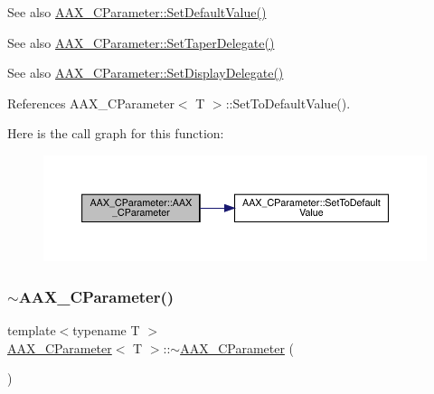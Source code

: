 \begin{DoxyItemize}
\item \begin{DoxySeeAlso}{See also}
\mbox{\hyperlink{a01537_af6f47fe823dd44a0434ca5041f08d0bd}{A\+A\+X\+\_\+\+C\+Parameter\+::\+Set\+Default\+Value()}}
\end{DoxySeeAlso}

\item \begin{DoxySeeAlso}{See also}
\mbox{\hyperlink{a01537_a73951bf97667382f01103a9230ce0c3e}{A\+A\+X\+\_\+\+C\+Parameter\+::\+Set\+Taper\+Delegate()}}
\end{DoxySeeAlso}

\item \begin{DoxySeeAlso}{See also}
\mbox{\hyperlink{a01537_a75619ec0a487c28966dc5448e4d2ab05}{A\+A\+X\+\_\+\+C\+Parameter\+::\+Set\+Display\+Delegate()}} 
\end{DoxySeeAlso}

\end{DoxyItemize}

References A\+A\+X\+\_\+\+C\+Parameter$<$ T $>$\+::\+Set\+To\+Default\+Value().

Here is the call graph for this function\+:
\nopagebreak
\begin{figure}[H]
\begin{center}
\leavevmode
\includegraphics[width=350pt]{a01537_a3cba283b1eb665a511b400981aecf5e5_cgraph}
\end{center}
\end{figure}
\mbox{\label{a01537_a4f78668b1bb9aa03ac8f06cb9205fef6}} 
\subsubsection{\texorpdfstring{$\sim$AAX\_CParameter()}{~AAX\_CParameter()}}
{\footnotesize\ttfamily template$<$typename T $>$ \\
\mbox{\hyperlink{a01537}{A\+A\+X\+\_\+\+C\+Parameter}}$<$ T $>$\+::$\sim$\mbox{\hyperlink{a01537}{A\+A\+X\+\_\+\+C\+Parameter}} (\begin{DoxyParamCaption}{ }\end{DoxyParamCaption})}



